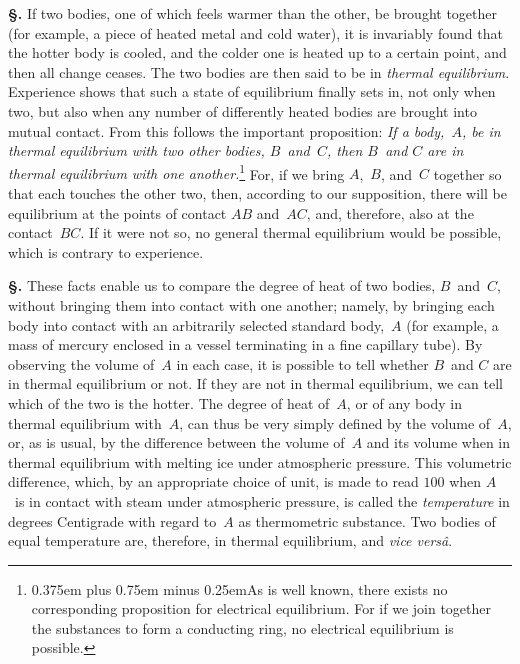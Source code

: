 \documentclass[12pt]{book}[2005/09/16]
\newcommand{\Loosen}{\spaceskip 0.375em plus 0.75em minus 0.25em}
\newcommand{\Section}[1]{
  \medskip\par\textbf{§\;#1}
  \label{section:#1}
}
\newcommand{\PageSep}[1]{\ignorespaces}
\DeclareMathOperator{\aq}{\, aq.}
\begin{document}
\Section{2.} If two bodies, one of which feels warmer than the
other, be brought together (for example, a piece of heated
metal and cold water), it is invariably found that the hotter
body is cooled, and the colder one is heated up to a certain
\PageSep{2}
point, and then all change ceases. The two bodies are then
said to be in \emph{thermal equilibrium}. Experience shows that
%
%
such a state of equilibrium finally sets in, not only when
two, but also when any number of differently heated bodies
are brought into mutual contact. From this follows the
important proposition: \emph{If a body,~$A$, be in thermal equilibrium
with two other bodies, $B$~and~$C$, then $B$~and $C$ are in
thermal equilibrium with one another.}\footnote
  {\Loosen As is well known, there exists no corresponding proposition for electrical
  equilibrium. For if we join together the substances \ce{Cu $\mid$ CuSO4 $\aq$ $\mid$
  ZnSO4 $\aq$ $\mid$ Zn} to form a conducting ring, no electrical equilibrium is
  possible.}
For, if we bring $A$,~$B$,
and~$C$ together so that each touches the other two, then,
according to our supposition, there will be equilibrium at
the points of contact $AB$ and~$AC$, and, therefore, also at the
contact~$BC$. If it were not so, no general thermal equilibrium
would be possible, which is contrary to experience.

\Section{3.} These facts enable us to compare the degree of heat
of two bodies, $B$~and~$C$, without bringing them into contact
with one another; namely, by bringing each body into
contact with an arbitrarily selected standard body,~$A$ (for
example, a mass of mercury enclosed in a vessel terminating
in a fine capillary tube). By observing the volume of~$A$
in each case, it is possible to tell whether $B$~and $C$ are in
thermal equilibrium or not. If they are not in thermal
equilibrium, we can tell which of the two is the hotter. The
degree of heat of~$A$, or of any body in thermal equilibrium
with~$A$, can thus be very simply defined by the volume of~$A$,
or, as is usual, by the difference between the volume of~$A$
and its volume when in thermal equilibrium with melting
ice under atmospheric pressure. This volumetric difference,
which, by an appropriate choice of unit, is made to read $100$
when $A$~is in contact with steam under atmospheric pressure,
is called the \emph{temperature} in degrees Centigrade with regard
%
to~$A$ as thermometric substance. Two bodies of equal
temperature are, therefore, in thermal equilibrium, and \textit{vice
versâ}.
\PageSep{3}
\end{document}
